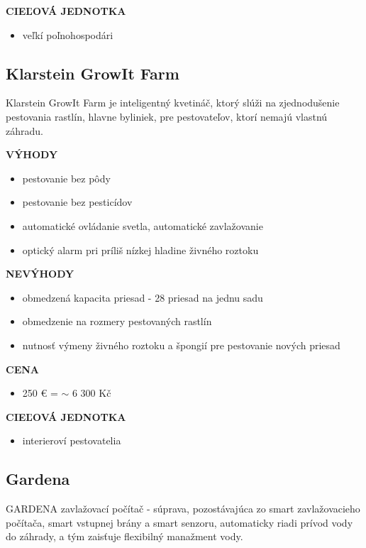 \documentclass[twoside]{ctuthesis}
\theoremstyle{plain}
\theoremstyle{definition}
\theoremstyle{note}
\begin{document}
\textbf{CIEĽOVÁ JEDNOTKA}
\begin{itemize}
\item veľkí poľnohospodári
\end{itemize}


\subsection*{Klarstein GrowIt Farm}
Klarstein GrowIt Farm je inteligentný kvetináč, ktorý slúži na zjednodušenie pestovania rastlín, hlavne byliniek, pre pestovateľov, ktorí nemajú vlastnú záhradu.  \cite{klarstein}
\newline

\textbf{VÝHODY}
\begin{itemize}
\item pestovanie bez pôdy
\item pestovanie bez pesticídov
\item automatické ovládanie svetla, automatické zavlažovanie
\item optický alarm pri príliš nízkej hladine živného roztoku
\end{itemize}

\textbf{NEVÝHODY}
\begin{itemize}
\item obmedzená kapacita priesad - 28 priesad na jednu sadu
\item obmedzenie na rozmery pestovaných rastlín
\item nutnosť výmeny živného roztoku a špongií pre pestovanie nových priesad
 \end{itemize}

\textbf{CENA}
\begin{itemize}
\item 250 €  =  $\sim$ 6 300 Kč 
 \end{itemize}

\textbf{CIEĽOVÁ JEDNOTKA}
\begin{itemize}
\item interieroví pestovatelia
\end{itemize}

\subsection*{Gardena}
GARDENA zavlažovací počítač - súprava, pozostávajúca zo smart zavlažovacieho počítača, smart vstupnej brány a smart senzoru, automaticky riadi prívod vody do záhrady, a tým zaisťuje flexibilný manažment vody. \cite{gardena}
\newline
\end{document}
